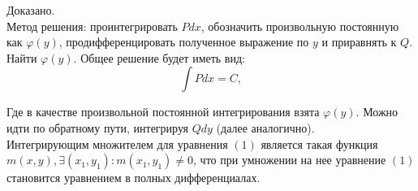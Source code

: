 \documentclass{article}
\begin{document}
	Доказано.\\

	Метод решения: проинтегрировать $Pdx$, обозначить произвольную постоянную как $\varphi(y)$, продифференцировать полученное выражение по $y$ и приравнять к $Q$. Найти $\varphi(y)$. Общее решение будет иметь вид:
	\begin{equation}
		\int Pdx = C,
	\end{equation}

	Где в качестве произвольной постоянной интегрирования взята $\varphi(y)$. Можно идти по обратному пути, интегрируя $Qdy$ (далее аналогично).\\

	Интегрирующим множителем для уравнения $(1)$ является такая функция $m(x,y), \exists (x_1,y_1): m(x_1,y_1)\neq 0$, что при умножении на нее уравнение $(1)$ становится уравнением в полных дифференциалах.
\end{document}

